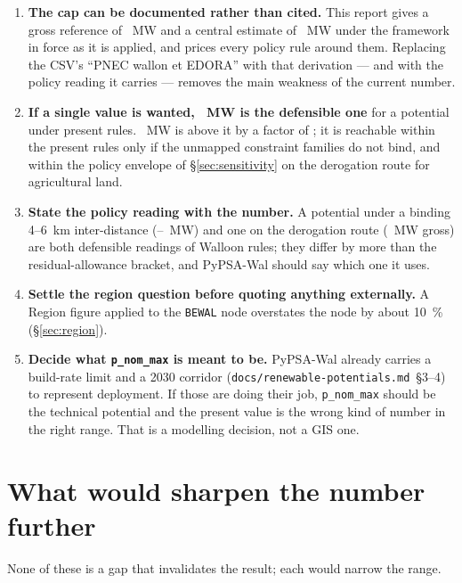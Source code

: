 \documentclass[11pt,a4paper]{article}
\begin{document}
\begin{enumerate}
  \item \textbf{The cap can be documented rather than cited.} This report gives
    a gross reference of \PlacePnom{}~MW and a central estimate of
    \ResCentral{}~MW under the framework in force as it is applied, and prices
    every policy rule around them. Replacing the CSV's ``PNEC wallon et EDORA''
    with that derivation --- and with the policy reading it carries --- removes
    the main weakness of the current number.
  \item \textbf{If a single value is wanted, \ResCentral{}~MW is the defensible
    one} for a potential under present rules. \CapToday{}~MW is above it by a
    factor of \CapRatioCentral{}; it is reachable within the present rules only
    if the unmapped constraint families do not bind, and within the policy
    envelope of §\ref{sec:sensitivity} on the derogation route for agricultural
    land.
  \item \textbf{State the policy reading with the number.} A potential under a
    binding 4--6~km inter-distance (\InterdistLow{}--\InterdistHigh{}~MW) and one
    on the derogation route (\SensNoCorridorMW{}~MW gross) are both defensible
    readings of Walloon rules; they differ by more than the residual-allowance
    bracket, and PyPSA-Wal should say which one it uses.
  \item \textbf{Settle the region question before quoting anything externally.}
    A Region figure applied to the \texttt{BEWAL} node overstates the node by
    about \SI{10}{\percent} (§\ref{sec:region}).
  \item \textbf{Decide what \texttt{p\_nom\_max} is meant to be.} PyPSA-Wal
    already carries a build-rate limit and a 2030 corridor
    (\texttt{docs/renewable-potentials.md}~§3--4) to represent deployment. If
    those are doing their job, \texttt{p\_nom\_max} should be the technical
    potential and the present value is the wrong kind of number in the right
    range. That is a modelling decision, not a GIS one.
\end{enumerate}

\section{What would sharpen the number further}

None of these is a gap that invalidates the result; each would narrow the range.
\end{document}
